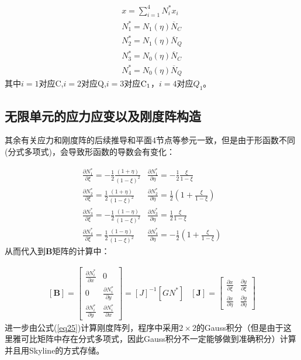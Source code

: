 \documentclass[forprint]{WHUBachelor}
\begin{document}
\begin{equation}
\begin{array}{c}
x=\sum_{i=1}^{4}N_{i}^{*}x_{i}\\
N_{1}^{*}=N_{1}(\eta)\overline{N}_{C}\\
N_{2}^{*}=N_{1}(\eta)\overline{N}_{Q}\\
N_{3}^{*}=N_{0}(\eta)\overline{N}_{C}\\
N_{4}^{*}=N_{0}(\eta)\overline{N}_{Q}
\end{array}\label{eq35}
\end{equation}
其中$i=1$对应C,$i=2$对应Q,$i=3$对应${\rm C_{1}}$，$i=4$对应$Q_{1}$。

\subsection{无限单元的应力应变以及刚度阵构造}

其余有关应力和刚度阵的后续推导和平面4节点等参元一致，但是由于形函数不同(分式多项式)，会导致形函数的导数会有变化：

\begin{equation}
\begin{array}{ll}
{\frac{\partial N_{1}^{*}}{\partial\xi}=-\frac{1}{2}\frac{(1+\eta)}{(1-\xi)^{2}}} & {\frac{\partial N_{1}^{*}}{\partial\eta}=-\frac{1}{2}\frac{\xi}{1-\xi}}\\
{\frac{\partial N_{2}^{*}}{\partial\xi}=\frac{1}{2}\frac{(1+\eta)}{(1-\xi)^{2}}} & {\frac{\partial N_{2}^{*}}{\partial\eta}=\frac{1}{2}\left(1+\frac{\xi}{1-\xi}\right)}\\
{\frac{\partial N_{3}^{*}}{\partial\xi}=-\frac{1}{2}\frac{(1-\eta)}{(1-\xi)^{2}}} & {\frac{\partial N_{3}^{*}}{\partial\eta}=\frac{1}{2}\frac{\xi}{1-\xi}}\\
{\frac{\partial N_{4}^{*}}{\partial\xi}=\frac{1}{2}\frac{(1-\eta)}{(1-\xi)^{2}}} & {\frac{\partial N_{4}^{*}}{\partial\eta}=-\frac{1}{2}\left(1+\frac{\xi}{1-\xi}\right)}
\end{array}\label{eq36}
\end{equation}
从而代入到$\bm{B}$矩阵的计算中：

\begin{equation}
\begin{array}{cc}
[\boldsymbol{B}]=\left[\begin{array}{cc}
{\frac{\partial N_{i}^{*}}{\partial x}} & {0}\\
{0} & {\frac{\partial N_{i}^{*}}{\partial y}}\\
{\frac{\partial N_{i}^{*}}{\partial y}} & {\frac{\partial N_{i}^{*}}{\partial x}}
\end{array}\right]=[J]^{-1}\left[GN^{*}\right] & [\mathbf{J}]=\left[\begin{array}{cc}
{\frac{\partial x}{\partial\xi}} & {\frac{\partial y}{\partial\xi}}\\
{\frac{\partial x}{\partial\eta}} & {\frac{\partial y}{\partial\eta}}
\end{array}\right]\end{array}\label{eq37}
\end{equation}
进一步由公式(\ref{eq25})计算刚度阵列，程序中采用$2\times2$的Gauss积分（但是由于这里雅可比矩阵中存在分式多项式，因此Gauss积分不一定能够做到准确积分）计算并且用Skyline的方式存储。
\end{document}
